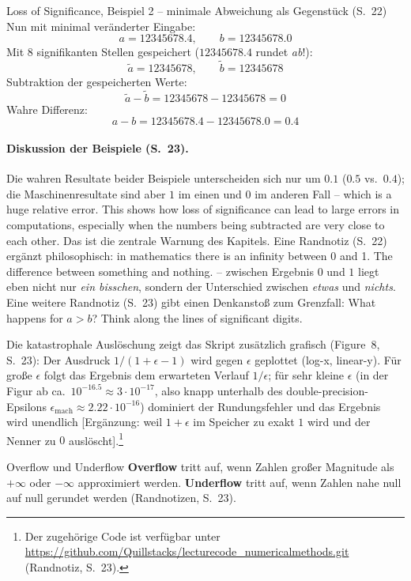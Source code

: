 \begin{bspbox}{Loss of Significance, Beispiel 2 -- minimale Abweichung als Gegenstück (S.~22)}
Nun mit minimal veränderter Eingabe:
\[
a = 12345678.4, \qquad b = 12345678.0
\]
Mit 8 signifikanten Stellen gespeichert ($12345678.4$ rundet \emph{ab}!):
\[
\tilde{a} = 12345678, \qquad \tilde{b} = 12345678
\]
Subtraktion der gespeicherten Werte:
\[
\tilde{a} - \tilde{b} = 12345678 - 12345678 = 0
\]
Wahre Differenz:
\[
a - b = 12345678.4 - 12345678.0 = 0.4
\]
\end{bspbox}

\paragraph{Diskussion der Beispiele (S.~23).} Die wahren Resultate beider Beispiele unterscheiden sich nur um $0.1$ ($0.5$ vs.\ $0.4$); die Maschinenresultate sind aber $1$ im einen und $0$ im anderen Fall -- \glqq which is a huge relative error. This shows how loss of significance can lead to large errors in computations, especially when the numbers being subtracted are very close to each other.\grqq{} Das ist die zentrale Warnung des Kapitels. Eine Randnotiz (S.~22) ergänzt philosophisch: \glqq in mathematics there is an infinity between 0 and 1. The difference between something and nothing.\grqq{} -- zwischen Ergebnis $0$ und $1$ liegt eben nicht nur \emph{ein bisschen}, sondern der Unterschied zwischen \emph{etwas} und \emph{nichts}. Eine weitere Randnotiz (S.~23) gibt einen Denkanstoß zum Grenzfall: \glqq What happens for $a > b$? Think along the lines of significant digits.\grqq{}

Die katastrophale Auslöschung zeigt das Skript zusätzlich grafisch (Figure~8, S.~23): Der Ausdruck $1/(1 + \epsilon - 1)$ wird gegen $\epsilon$ geplottet (log-x, linear-y). Für große $\epsilon$ folgt das Ergebnis dem erwarteten Verlauf $1/\epsilon$; für sehr kleine $\epsilon$ (in der Figur ab ca.\ $10^{-16.5} \approx 3 \cdot 10^{-17}$, also knapp unterhalb des double-precision-Epsilons $\epsilon_{\text{mach}} \approx 2.22 \cdot 10^{-16}$) dominiert der Rundungsfehler und das Ergebnis wird unendlich [Ergänzung: weil $1 + \epsilon$ im Speicher zu exakt $1$ wird und der Nenner zu $0$ auslöscht].\footnote{Der zugehörige Code ist verfügbar unter \url{https://github.com/Quillstacks/lecturecode_numericalmethods.git} (Randnotiz, S.~23).}

\begin{defbox}{Overflow und Underflow}
\textbf{Overflow} tritt auf, wenn Zahlen großer Magnitude als $+\infty$ oder $-\infty$ approximiert werden. \textbf{Underflow} tritt auf, wenn Zahlen nahe null auf null gerundet werden (Randnotizen, S.~23).
\end{defbox}

